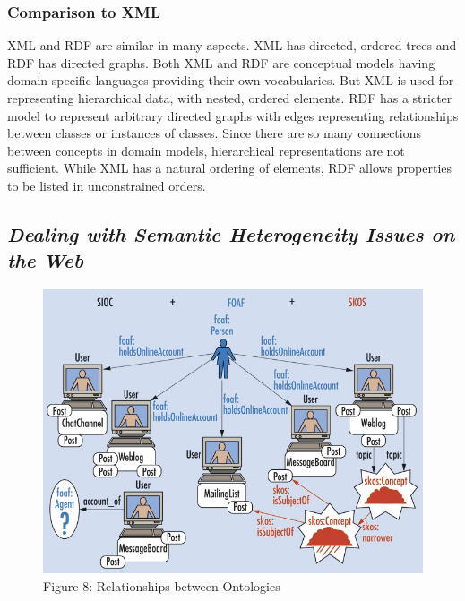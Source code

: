 \documentclass[10pt,journal,compsoc]{IEEEtran}
\begin{document}
\subsubsection{Comparison to XML}
XML and RDF are similar in many aspects.  XML has directed, ordered trees and RDF has directed graphs.  Both XML and RDF are conceptual models having domain specific languages providing their own vocabularies.  But XML is used for representing hierarchical data, with nested, ordered elements.  RDF has a stricter model to represent arbitrary directed graphs with edges representing relationships between classes or instances of classes.  Since there are so many connections between concepts in domain models, hierarchical representations are not sufficient.  While XML has a natural ordering of elements, RDF allows properties to be listed in unconstrained orders.  

\subsection{\textit{Dealing with Semantic Heterogeneity Issues on the Web} \cite{gracia_dealing_2011}}


\begin{figure}[hbt]
\begin{center}
\includegraphics[width=6in]{Daniela1New.JPG}       
\center\caption*{Figure 8: Relationships between Ontologies \cite{6190504} }  
\label{fig1}
\end{center}
\end{figure}
\end{document}
